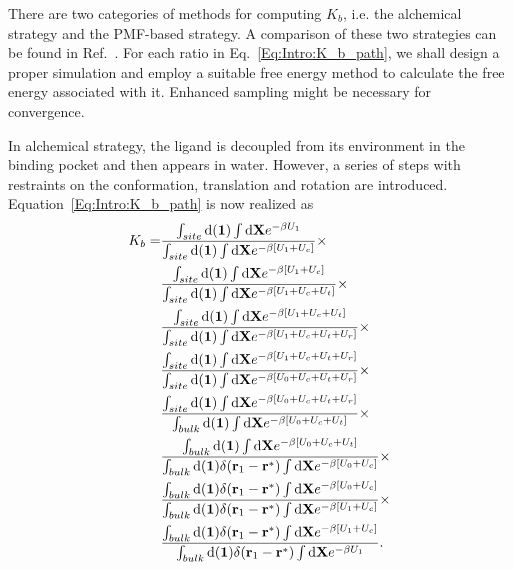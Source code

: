 There are two categories of methods for computing $K_b$, i.e. the alchemical strategy\cite{DengJCTC2006} and the PMF-based strategy\cite{WooPNAS2005}. A comparison of these two strategies can be found in Ref.~\cite{DengJPCB2009,GumbartJCTC2013}. For each ratio in Eq.~\ref{Eq:Intro:K_b_path}, we shall design a proper simulation and employ a suitable free energy method to calculate the free energy associated with it. Enhanced sampling might be necessary for convergence.

In alchemical strategy, the ligand is decoupled from its environment in the binding pocket and then appears in water. However, a series of steps with restraints on the conformation, translation and rotation are introduced. Equation~\ref{Eq:Intro:K_b_path} is now realized as
\begin{align}
  K_b=&\frac{\int_{site}\diff(\mathbf{1})\int \diff\mathbf{X}e^{-\beta U_1}}{\int_{site}\diff(\mathbf{1})\int \diff\mathbf{X}e^{-\beta [U_1+U_c]}}\times\notag\\
      &\frac{\int_{site}\diff(\mathbf{1})\int \diff\mathbf{X}e^{-\beta [U_1+U_c]}}{\int_{site}\diff(\mathbf{1})\int \diff\mathbf{X}e^{-\beta [U_1+U_c+U_t]}}\times\notag\\
      &\frac{\int_{site}\diff(\mathbf{1})\int \diff\mathbf{X}e^{-\beta [U_1+U_c+U_t]}}{\int_{site}\diff(\mathbf{1})\int \diff\mathbf{X}e^{-\beta [U_1+U_c+U_t+U_r]}}\times\notag\\
      &\frac{\int_{site}\diff(\mathbf{1})\int \diff\mathbf{X}e^{-\beta [U_1+U_c+U_t+U_r]}}{\int_{site}\diff(\mathbf{1})\int \diff\mathbf{X}e^{-\beta [U_0+U_c+U_t+U_r]}}\times\notag\\
      &\frac{\int_{site}\diff(\mathbf{1})\int \diff\mathbf{X}e^{-\beta [U_0+U_c+U_t+U_r]}}{\int_{bulk}\diff(\mathbf{1})\int \diff\mathbf{X}e^{-\beta [U_0+U_c+U_t]}}\times\notag\\
      &\frac{\int_{bulk}\diff(\mathbf{1})\int \diff\mathbf{X}e^{-\beta [U_0+U_c+U_t]}}{\int_{bulk}\diff(\mathbf{1})\delta(\mathbf{r}_1-\mathbf{r}^*)\int \diff\mathbf{X}e^{-\beta [U_0+U_c]}}\times\notag\\
      &\frac{\int_{bulk}\diff(\mathbf{1})\delta(\mathbf{r}_1-\mathbf{r}^*)\int \diff\mathbf{X}e^{-\beta [U_0+U_c]}}{\int_{bulk}\diff(\mathbf{1})\delta(\mathbf{r}_1-\mathbf{r}^*)\int \diff\mathbf{X}e^{-\beta [U_1+U_c]}}\times\notag\\
      &\frac{\int_{bulk}\diff(\mathbf{1})\delta(\mathbf{r}_1-\mathbf{r}^*)\int \diff\mathbf{X}e^{-\beta [U_1+U_c]}}{\int_{bulk}\diff(\mathbf{1})\delta(\mathbf{r}_1-\mathbf{r}^*)\int \diff\mathbf{X}e^{-\beta U_1}}.
\end{align}

